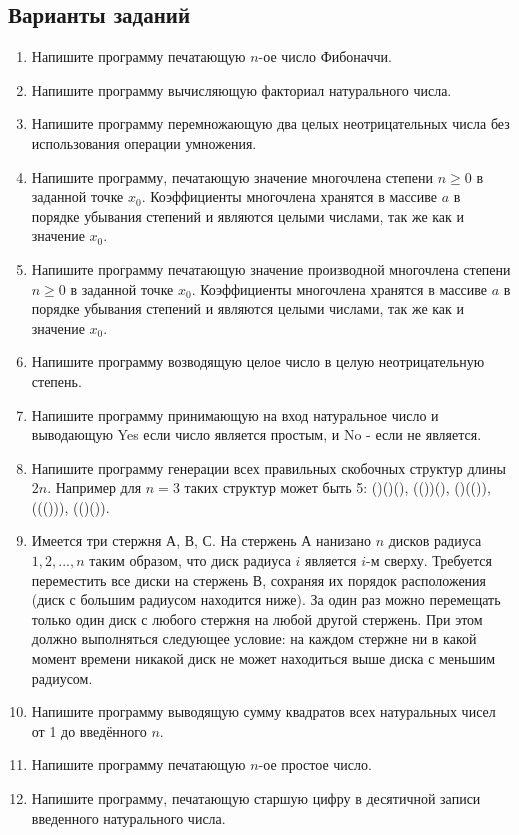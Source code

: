 \documentclass[a4paper,12pt]{article}
\begin{document}
\subsection{Варианты заданий}
\begin{enumerate}
	\item Напишите программу печатающую $n$-ое число Фибоначчи.
	\item Напишите программу вычисляющую факториал натурального числа.
	\item Напишите программу перемножающую два целых неотрицательных числа без использования операции умножения.
	\item Напишите программу, печатающую значение многочлена степени $n\geq0$ в заданной точке $x_{0}$. Коэффициенты многочлена хранятся в массиве $a$ в порядке убывания степений и являются целыми числами, так же как и значение $x_{0}$.
	\item Напишите программу печатающую значение производной многочлена степени $n\geq0$ в заданной точке $x_{0}$. Коэффициенты многочлена хранятся в массиве $a$ в порядке убывания степений и являются целыми числами, так же как и значение $x_{0}$.
	\item Напишите программу возводящую целое число в целую неотрицательную степень.
	\item Напишите программу принимающую на вход натуральное число и выводающую Yes если число является простым, и No - если не является.
	\item Напишите программу генерации всех правильных скобочных структур длины $2n$. Например для $n=3$ таких структур может быть 5: ()()(), (())(), ()(()), ((())), (()()).
	\item Имеется три стержня А, В, С. На стержень А нанизано $n$ дисков радиуса $1, 2,..., n$ таким образом, что диск радиуса $i$ является $i$-м сверху. Требуется переместить все диски на стержень В, сохраняя их порядок расположения (диск с большим радиусом находится ниже). За один раз можно перемещать только один диск с любого стержня на любой другой стержень. При этом должно выполняться следующее условие: на каждом стержне ни в какой момент времени никакой диск не может находиться выше диска с меньшим радиусом. 
	\item Напишите программу выводящую сумму квадратов всех натуральных чисел от 1 до введённого $n$.
	\item Напишите программу печатающую $n$-ое простое число.
	\item Напишите программу, печатающую старшую цифру в десятичной записи введенного натурального числа.

\end{enumerate}
\end{document}
